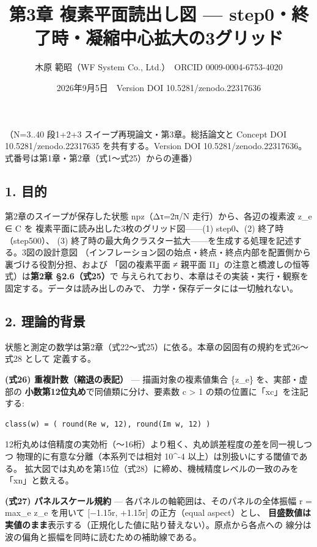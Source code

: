 \documentclass[
  a4paper,
]{ltjsarticle}
\title{第3章 複素平面読出し図 ---
step0・終了時・凝縮中心拡大の3グリッド}
\author{木原 範昭（WF System Co., Ltd.）　ORCID 0009-0004-6753-4020}
\date{2026年9月5日　Version DOI 10.5281/zenodo.22317636}
\begin{document}
\maketitle

（N=3..40 段1+2+3 スイープ再現論文・第3章。総括論文と Concept DOI
10.5281/zenodo.22317635 を共有する。Version DOI
10.5281/zenodo.22317636。 式番号は第1章・第2章（式1〜式25）からの連番）

\subsection{1. 目的}\label{ux76eeux7684}

第2章のスイープが保存した状態 npz（Δτ=2π/N 走行）から、各辺の複素波 z\_e
∈ C を 複素平面に読み出した3枚のグリッド図------(1) step0、(2)
終了時（step500）、 (3)
終了時の最大角クラスター拡大------を生成する処理を記述する。3図の設計意図
（インフレーション図の始点・終点・終点内部を配置側から裏づける役割分担、および
「図の複素平面 ≠ 親平面 Π」の注意と橋渡しの恒等式）は\textbf{第2章
§2.6（式25）}で
与えられており、本章はその実装・実行・観察を固定する。データは読み出しのみで、
力学・保存データには一切触れない。

\subsection{2. 理論的背景}\label{ux7406ux8ad6ux7684ux80ccux666f}

状態と測定の数学は第2章（式22〜式25）に依る。本章の図固有の規約を式26〜式28
として 定義する。

\textbf{(式26) 重複計数（縮退の表記）} --- 描画対象の複素値集合 \{z\_e\}
を、実部・虚部の \textbf{小数第12位丸め}で同値類に分け、要素数 c
\textgreater{} 1 の類の位置に「xc」を注記する:

\begin{verbatim}
class(w) = ( round(Re w, 12), round(Im w, 12) )
\end{verbatim}

12桁丸めは倍精度の実効桁（〜16桁）より粗く、丸め誤差程度の差を同一視しつつ
物理的に有意な分離（本系列では相対 10\^{}-4
以上）は別扱いにする閾値である。
拡大図では丸めを第15位（式28）に締め、機械精度レベルの一致のみを「xn」と数える。

\textbf{(式27) パネルスケール規約} ---
各パネルの軸範囲は、そのパネルの全体振幅 r = max\_e
\textbar z\_e\textbar{} を用いて {[}−1.15r, +1.15r{]} の正方（equal
aspect）とし、
\textbf{目盛数値は実値のまま}表示する（正規化した値に貼り替えない）。原点から各点への
線分は波の偏角と振幅を同時に読むための補助線である。
\end{document}
